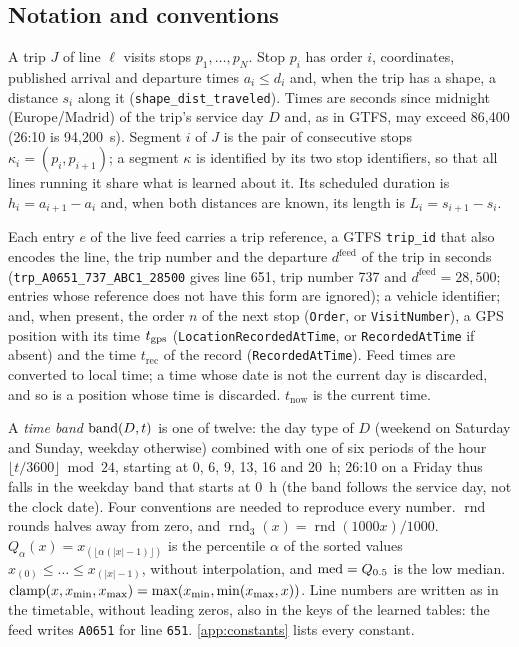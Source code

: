 
\subsection{Notation and conventions}
\label{sec:notation}

A trip $J$ of line $\ell$ visits stops $p_1,\dots,p_N$. Stop $p_i$ has order $i$, coordinates, published arrival and
departure times $a_i\le d_i$ and, when the trip has a shape, a distance $s_i$ along it (\texttt{shape\_dist\_traveled}).
Times are seconds since midnight (Europe/Madrid) of the trip's service day $D$ and, as in GTFS, may exceed 86,400
(26:10 is 94,200~s). Segment $i$ of $J$ is the pair of consecutive stops $\kappa_i=(p_i,p_{i+1})$; a segment $\kappa$
is identified by its two stop identifiers, so that all lines running it share what is learned about it. Its scheduled
duration is $h_i=a_{i+1}-a_i$ and, when both distances are known, its length is $L_i=s_{i+1}-s_i$.

Each entry $e$ of the live feed carries a trip reference, a GTFS \texttt{trip\_id} that also encodes the line, the
trip number and the departure $d^{\mathrm{feed}}$ of the trip in seconds (\texttt{trp\_A0651\_737\_ABC1\_28500} gives
line 651, trip number 737 and $d^{\mathrm{feed}}=28{,}500$; entries whose reference does not have this form are
ignored); a vehicle identifier; and, when present, the order $n$ of the next stop (\texttt{Order}, or
\texttt{VisitNumber}), a GPS position with its time $t_{\mathrm{gps}}$ (\texttt{LocationRecordedAtTime}, or
\texttt{RecordedAtTime} if absent) and the time $t_{\mathrm{rec}}$ of the record (\texttt{RecordedAtTime}). Feed
times are converted to local time; a time whose date is not the current day is discarded, and so is a position whose
time is discarded. $t_{\mathrm{now}}$ is the current time.

A \emph{time band} $\operatorname{band}(D,t)$ is one of twelve: the day type of $D$ (weekend on Saturday and Sunday, weekday
otherwise) combined with one of six periods of the hour $\lfloor t/3600\rfloor\bmod24$, starting at 0, 6, 9, 13, 16
and 20~h; 26:10 on a Friday thus falls in the weekday band that starts at 0~h (the band follows the service day, not the
clock date). Four conventions are needed to
reproduce every number. $\operatorname{rnd}$ rounds halves away from zero, and
$\operatorname{rnd}_3(x)=\operatorname{rnd}(1000x)/1000$. $Q_\alpha(x)=x_{(\lfloor\alpha(|x|-1)\rfloor)}$ is the
percentile $\alpha$ of the sorted values $x_{(0)}\le\dots\le x_{(|x|-1)}$, without interpolation, and
$\operatorname{med}=Q_{0.5}$ is the low median. $\operatorname{clamp}(x,x_{\min},x_{\max})=\max(x_{\min},\min(x_{\max},x))$. Line numbers are
written as in the timetable, without leading zeros, also in the keys of the learned tables: the feed writes
\texttt{A0651} for line \texttt{651}. \ref{app:constants} lists every constant.

